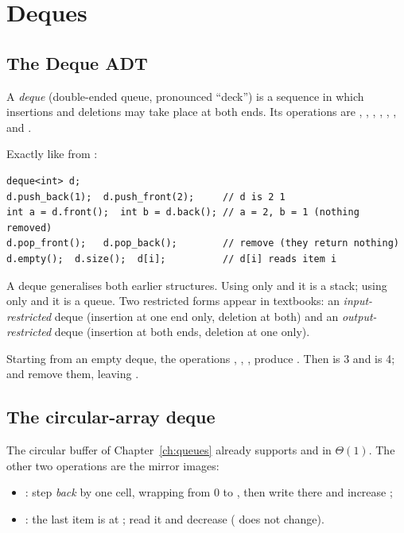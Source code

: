 \chapter{Deques}\label{ch:deques}

\section{The Deque ADT}

\begin{definition}[Deque]
A \emph{deque} (double-ended queue, pronounced ``deck'') is a sequence in which
insertions and deletions may take place at both ends. Its operations are
, , , ,
, ,  and .
\end{definition}

 Exactly like  from :
\begin{lstlisting}[style=starter]
deque<int> d;
d.push_back(1);  d.push_front(2);     // d is 2 1
int a = d.front();  int b = d.back(); // a = 2, b = 1 (nothing removed)
d.pop_front();   d.pop_back();        // remove (they return nothing)
d.empty();  d.size();  d[i];          // d[i] reads item i
\end{lstlisting}

A deque generalises both earlier structures. Using only  and
 it is a stack; using only  and  it is a
queue. Two restricted forms appear in textbooks: an \emph{input-restricted} deque
(insertion at one end only, deletion at both) and an \emph{output-restricted} deque
(insertion at both ends, deletion at one only).

\begin{example}
Starting from an empty deque, the operations , ,
,  produce . Then  is 3 and
 is 4;  and  remove them, leaving .
\end{example}

\section{The circular-array deque}

The circular buffer of Chapter~\ref{ch:queues} already supports  and
 in $\Theta(1)$. The other two operations are the mirror images:
\begin{itemize}
\item {}: step  \emph{back} by one cell, wrapping from 0 to
  , then write  there and increase ;
\item {}: the last item is at ; read it and
  decrease  ( does not change).
\end{itemize}

